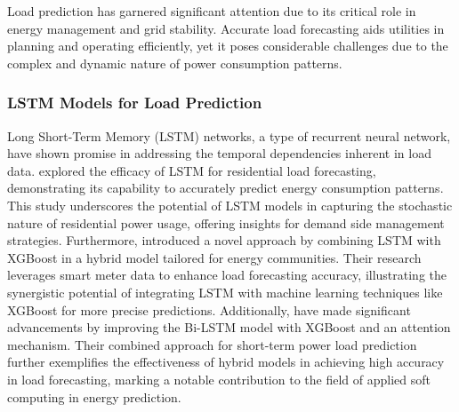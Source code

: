 \documentclass{article} %
\begin{document}
Load prediction has garnered significant attention due to its critical role in energy management and grid stability. Accurate load forecasting aids utilities in planning and operating efficiently, yet it poses considerable challenges due to the complex and dynamic nature of power consumption patterns.

\subsubsection{LSTM Models for Load Prediction}
Long Short-Term Memory (LSTM) networks, a type of recurrent neural network, have shown promise in addressing the temporal dependencies inherent in load data. \cite{simani2023using} explored the efficacy of LSTM for residential load forecasting, demonstrating its capability to accurately predict energy consumption patterns. This study underscores the potential of LSTM models in capturing the stochastic nature of residential power usage, offering insights for demand side management strategies. Furthermore, \cite{semmelmann2022load} introduced a novel approach by combining LSTM with XGBoost in a hybrid model tailored for energy communities. Their research leverages smart meter data to enhance load forecasting accuracy, illustrating the synergistic potential of integrating LSTM with machine learning techniques like XGBoost for more precise predictions. Additionally, \cite{dai2022improving} have made significant advancements by improving the Bi-LSTM model with XGBoost and an attention mechanism. Their combined approach for short-term power load prediction further exemplifies the effectiveness of hybrid models in achieving high accuracy in load forecasting, marking a notable contribution to the field of applied soft computing in energy prediction.
\end{document}
